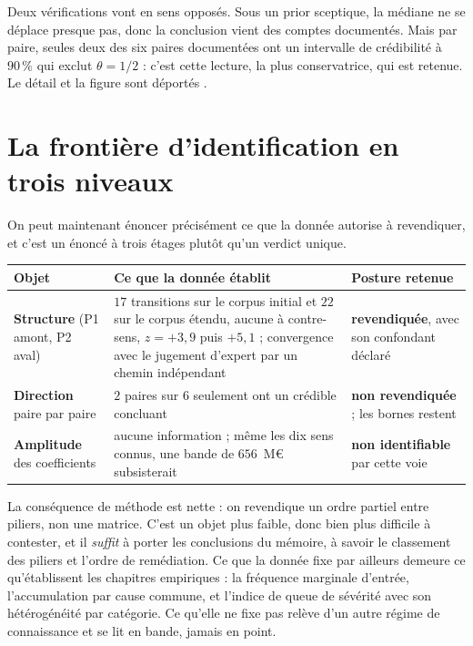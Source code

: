 Deux vérifications vont en sens opposés. Sous un prior sceptique, la médiane ne se déplace
presque pas, donc la conclusion vient des comptes documentés. Mais par paire, seules deux des six
paires documentées ont un intervalle de crédibilité à $90\,\%$ qui exclut $\theta=1/2$ : c'est
cette lecture, la plus conservatrice, qui est retenue. Le détail et la figure sont déportés
\matcomp.

\section{La frontière d'identification en trois niveaux}

On peut maintenant énoncer précisément ce que la donnée autorise à revendiquer, et c'est un
énoncé à trois étages plutôt qu'un verdict unique.

\begin{center}\small
\renewcommand{\arraystretch}{1.3}
\begin{tabular}{@{}p{3.2cm} p{7.4cm} p{4.2cm}@{}}
\toprule
\textbf{Objet} & \textbf{Ce que la donnée établit} & \textbf{Posture retenue} \\
\midrule
\textbf{Structure} \newline (P1 amont, P2 aval) &
$17$ transitions sur le corpus initial et $22$ sur le corpus étendu, aucune à contre-sens,
$z=+3{,}9$ puis $+5{,}1$ ; convergence avec le jugement d'expert par un chemin indépendant &
\textbf{revendiquée}, avec son confondant déclaré \\
\textbf{Direction} \newline paire par paire &
$2$ paires sur $6$ seulement ont un crédible concluant &
\textbf{non revendiquée} ; les bornes restent \\
\textbf{Amplitude} \newline des coefficients &
aucune information ; même les dix sens connus, une bande de $656$~M\euro{} subsisterait &
\textbf{non identifiable} par cette voie \\
\bottomrule
\end{tabular}
\end{center}

\vspace{4pt}
La conséquence de méthode est nette : on revendique un ordre partiel entre piliers, non
une matrice. C'est un objet plus faible, donc bien plus difficile à contester, et il \emph{suffit}
à porter les conclusions du mémoire, à savoir le classement des piliers et l'ordre de
remédiation. Ce que la donnée fixe par ailleurs demeure ce qu'établissent les chapitres
empiriques : la fréquence marginale d'entrée, l'accumulation par cause commune, et l'indice de
queue de sévérité avec son hétérogénéité par catégorie. Ce qu'elle ne fixe pas relève d'un autre
régime de connaissance et se lit en bande, jamais en point.

